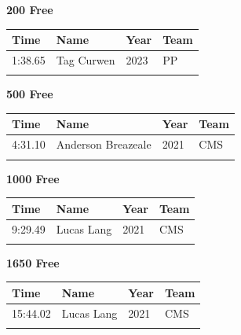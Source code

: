 \vspace{1.2em}
\noindent\begin{minipage}[t]{0.98\textwidth}
\centering
\textbf{\textcolor{teamprimary}{200 Free}}\par
\vspace{0.5em}
\centering
\small
\renewcommand{\arraystretch}{1.0}
\setlength{\tabcolsep}{4pt}
\begin{tabular}{@{}p{2.5cm}p{4.5cm}p{1.5cm}p{2.5cm}@{}}
\toprule
\textbf{Time} & \textbf{Name} & \textbf{Year} & \textbf{Team} \\
\midrule
1:38.65 & Tag Curwen & 2023 & PP \\
\bottomrule
\vspace{0.5em}
\end{tabular}
\end{minipage}
\vspace{1.2em}
\noindent\begin{minipage}[t]{0.98\textwidth}
\centering
\textbf{\textcolor{teamprimary}{500 Free}}\par
\vspace{0.5em}
\centering
\small
\renewcommand{\arraystretch}{1.0}
\setlength{\tabcolsep}{4pt}
\begin{tabular}{@{}p{2.5cm}p{4.5cm}p{1.5cm}p{2.5cm}@{}}
\toprule
\textbf{Time} & \textbf{Name} & \textbf{Year} & \textbf{Team} \\
\midrule
4:31.10 & Anderson Breazeale & 2021 & CMS \\
\bottomrule
\vspace{0.5em}
\end{tabular}
\end{minipage}
\vspace{1.2em}
\noindent\begin{minipage}[t]{0.98\textwidth}
\centering
\textbf{\textcolor{teamprimary}{1000 Free}}\par
\vspace{0.5em}
\centering
\small
\renewcommand{\arraystretch}{1.0}
\setlength{\tabcolsep}{4pt}
\begin{tabular}{@{}p{2.5cm}p{4.5cm}p{1.5cm}p{2.5cm}@{}}
\toprule
\textbf{Time} & \textbf{Name} & \textbf{Year} & \textbf{Team} \\
\midrule
9:29.49 & Lucas Lang & 2021 & CMS \\
\bottomrule
\vspace{0.5em}
\end{tabular}
\end{minipage}
\vspace{1.2em}
\noindent\begin{minipage}[t]{0.98\textwidth}
\centering
\textbf{\textcolor{teamprimary}{1650 Free}}\par
\vspace{0.5em}
\centering
\small
\renewcommand{\arraystretch}{1.0}
\setlength{\tabcolsep}{4pt}
\begin{tabular}{@{}p{2.5cm}p{4.5cm}p{1.5cm}p{2.5cm}@{}}
\toprule
\textbf{Time} & \textbf{Name} & \textbf{Year} & \textbf{Team} \\
\midrule
15:44.02 & Lucas Lang & 2021 & CMS \\
\bottomrule
\vspace{0.5em}
\end{tabular}
\end{minipage}
